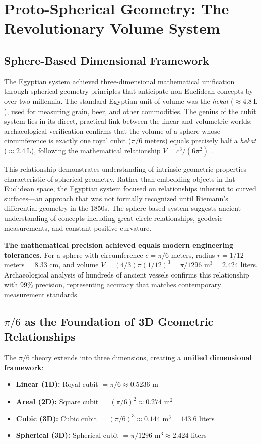 \documentclass[11pt]{article}
\begin{document}
\section{Proto-Spherical Geometry: The Revolutionary Volume System}


\subsection{Sphere-Based Dimensional Framework}

The Egyptian system achieved three-dimensional mathematical unification through spherical geometry principles that anticipate non-Euclidean concepts by over two millennia. The standard Egyptian unit of volume was the \textit{hekat} ($\approx \SI{4.8}{\liter}$), used for measuring grain, beer, and other commodities. The genius of the cubit system lies in its direct, practical link between the linear and volumetric worlds: archaeological verification confirms that the volume of a sphere whose circumference is exactly one royal cubit ($\pi/6$ meters) equals precisely half a \textit{hekat} ($\approx \SI{2.4}{\liter}$), following the mathematical relationship $V = c^3/(6\pi^2)$ \cite{zapassky2012ancient}.

This relationship demonstrates understanding of intrinsic geometric properties characteristic of spherical geometry. Rather than embedding objects in flat Euclidean space, the Egyptian system focused on relationships inherent to curved surfaces—an approach that was not formally recognized until Riemann's differential geometry in the 1850s. The sphere-based system suggests ancient understanding of concepts including great circle relationships, geodesic measurements, and constant positive curvature.

\textbf{The mathematical precision achieved equals modern engineering tolerances.} For a sphere with circumference $c = \pi/6$ meters, radius $r = 1/12$ meters = 8.33 cm, and volume $V = (4/3)\pi(1/12)^3 = \pi/1296 \text{ m}^3 = 2.424$ liters. Archaeological analysis of hundreds of ancient vessels confirms this relationship with 99\% precision, representing accuracy that matches contemporary measurement standards.

\subsection{\texorpdfstring{$\pi/6$}{pi/6} as the Foundation of 3D Geometric Relationships}

The $\pi/6$ theory extends into three dimensions, creating a \textbf{unified dimensional framework}:
\begin{itemize}
    \item \textbf{Linear (1D):} Royal cubit $= \pi/6 \approx 0.5236 \text{ m}$
    \item \textbf{Areal (2D):} Square cubit $= (\pi/6)^2 \approx 0.274 \text{ m}^2$
    \item \textbf{Cubic (3D):} Cubic cubit $= (\pi/6)^3 \approx 0.144 \text{ m}^3 = 143.6$ liters
    \item \textbf{Spherical (3D):} Spherical cubit $= \pi/1296 \text{ m}^3 \approx 2.424$ liters
\end{itemize}
\end{document}
